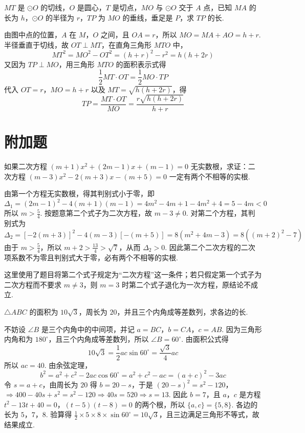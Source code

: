 \begin{problem}
\(MT\) 是 \(\odot O\) 的切线，\(O\) 是圆心，\(T\) 是切点，\(MO\) 与 \(\odot O\) 交于 \(A\) 点，已知 \(MA\) 的长为 \(h\)，\(\odot O\) 的半径为 \(r\)，\(TP\) 为 \(MO\) 的垂线，垂足是 \(P\)，求 \(TP\) 的长.

\end{problem}

\begin{solution}
由图中点的位置，\(A\) 在 \(M\)，\(O\) 之间，且 \(OA=r\)，所以 \(MO=MA+AO=h+r\). 半径垂直于切线，故 \(OT\perp MT\)，在直角三角形 \(MTO\) 中，
\[
MT^2=MO^2-OT^2=(h+r)^2-r^2=h(h+2r)
\]
又因为 \(TP\perp MO\)，用三角形 \(MTO\) 的面积表示式得
\[
\frac{1}{2}MT\cdot OT=\frac{1}{2}MO\cdot TP
\]
代入 \(OT=r\)，\(MO=h+r\) 以及 \(MT=\sqrt{h(h+2r)}\)，得
\[
TP=\frac{MT\cdot OT}{MO}=\frac{r\sqrt{h(h+2r)}}{h+r}
\]
\end{solution}

\section{附加题}

\begin{problem}
如果二次方程 \((m+1)x^2+(2m-1)x+(m-1)=0\) 无实数根，求证：二次方程 \((m-3)x^2-2(m+3)x-(m+5)=0\) 一定有两个不相等的实根.
\end{problem}

\begin{solution}
由第一个方程无实数根，得其判别式小于零，即
\[
\Delta_1=(2m-1)^2-4(m+1)(m-1)=4m^2-4m+1-4m^2+4=5-4m<0
\]
所以 \(m>\frac{5}{4}\). 按题意第二个式子为二次方程，故 \(m-3\ne0\). 对第二个方程，其判别式为
\[
\Delta_2=[-2(m+3)]^2-4(m-3)[-(m+5)]=8(m^2+4m-3)=8\left((m+2)^2-7\right)
\]
由于 \(m>\frac{5}{4}\)，所以 \(m+2>\frac{13}{4}>\sqrt{7}\)，从而 \(\Delta_2>0\). 因此第二个二次方程的二次项系数不为零且判别式大于零，必有两个不相等的实根.

这里使用了题目将第二个式子规定为“二次方程”这一条件；若只假定第一个式子为二次方程而不要求 \(m\ne3\)，则 \(m=3\) 时第二个式子退化为一次方程，原结论不成立.
\end{solution}

\begin{problem}
\(\triangle ABC\) 的面积为 \(10\sqrt{3}\)，周长为 \(20\)，并且三个内角成等差数列，求各边的长.
\end{problem}

\begin{solution}
不妨设 \(\angle B\) 是三个内角中的中间项，并记 \(a=BC\)，\(b=CA\)，\(c=AB\). 因为三角形内角和为 \(180^\circ\)，且三个内角成等差数列，所以 \(\angle B=60^\circ\). 由面积公式得
\[
10\sqrt{3}=\frac{1}{2}ac\sin60^\circ=\frac{\sqrt{3}}{4}ac
\]
所以 \(ac=40\). 由余弦定理，
\[
b^2=a^2+c^2-2ac\cos60^\circ=a^2+c^2-ac=(a+c)^2-3ac
\]
令 \(s=a+c\)，由周长为 \(20\) 得 \(b=20-s\)，于是
\((20-s)^2=s^2-120\)，\(\Longrightarrow 400-40s+s^2=s^2-120 \Longrightarrow 40s=520 \Longrightarrow s=13\).
因此 \(b=7\)，且 \(a\)，\(c\) 是方程
\(t^2-13t+40=0\)，\((t-5)(t-8)=0\)
的两个根，所以 \(\{a,c\}=\{5,8\}\). 各边的长为 \(5\)，\(7\)，\(8\). 验算得 \(\frac{1}{2}\times5\times8\times\sin60^\circ=10\sqrt{3}\)，且三边满足三角形不等式，故结果成立.
\end{solution}
